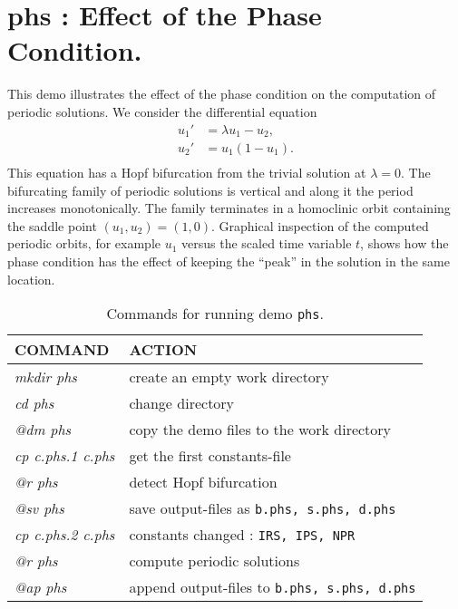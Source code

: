 \documentclass[12pt]{report}
\begin{document}
\section{ phs : Effect of the Phase Condition.} \label{sec:Demos_phs}
This demo illustrates the effect of the phase condition 
on the computation of periodic solutions.
We consider the differential equation
\begin{equation} \begin{array}{cl}
 u_1'&= \lambda u_1 - u_2,  \\
 u_2'&= u_1 (1-u_1) .  \\
\end{array} \end{equation}
This equation has a Hopf bifurcation from the trivial solution at $\lambda=0$. 
The bifurcating family of periodic solutions
is vertical and along it the period increases monotonically.
The family terminates in a homoclinic orbit containing the
saddle point $(u_1,u_2)=(1,0)$.
Graphical inspection of the computed periodic orbits,
for example $u_1$ versus the scaled time variable $t$,
shows how the phase condition has the effect of keeping the ``peak'' 
in the solution in the same location.

\begin{table}[htbp]
\begin{center}
\begin{tabular}{| l | l |}
\hline
  COMMAND  & ACTION \\
\hline
  {\it mkdir phs} & create an empty work directory \\ 
  {\it cd phs} & change directory \\
  {\it @dm phs} & copy the demo files to the work directory \\
\hline
  {\it cp c.phs.1 c.phs} & get the first constants-file \\ 
  {\it @r phs} & detect Hopf bifurcation \\ 
  {\it @sv phs} & save output-files as {\tt b.phs, s.phs, d.phs} \\ 
\hline
  {\it cp c.phs.2 c.phs} & constants changed : {\tt IRS, IPS, NPR} \\ 
  {\it @r phs} & compute periodic solutions \\ 
  {\it @ap phs} & append output-files to {\tt b.phs, s.phs, d.phs} \\ 
\hline
\end{tabular}
\caption{Commands for running demo {\tt phs}.}
\label{tbl:demo_phs}
\end{center}
\end{table}
\end{document}
